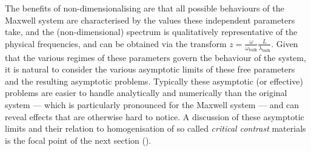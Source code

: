 The benefits of non-dimensionalising are that all possible behaviours of the Maxwell system are characterised by the values these independent parameters take, and the (non-dimensional) spectrum is qualitatively representative of the physical frequencies, and can be obtained via the transform $z = \frac{\omega}{\omega_{\mathrm{bulk}}} \frac{L}{\lambda_{\mathrm{bulk}}}$.
Given that the various regimes of these parameters govern the behaviour of the system, it is natural to consider the various asymptotic limits of these free parameters and the resulting asymptotic problems.
Typically these asymptotic (or effective) problems are easier to handle analytically and numerically than the original system --- which is particularly pronounced for the Maxwell system --- and can reveal effects that are otherwise hard to notice.
A discussion of these asymptotic limits and their relation to homogenisation of so called \emph{critical contrast} materials is the focal point of the next section ().

